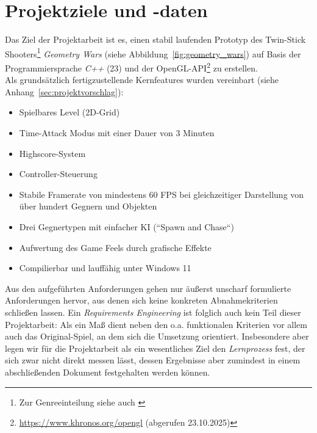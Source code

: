 \section{Projektziele und -daten}\label{sec:projektdaten}

Das Ziel der Projektarbeit ist es, einen stabil laufenden Prototyp des Twin-Stick Shooters\footnote{
Zur Genreeinteilung siehe auch \cite[]{GameDeveloper}
} \textit{Geometry Wars} (siehe Abbildung~\ref{fig:geometry_wars}) auf Basis der Programmiersprache \textit{C++} (23) und der OpenGL-API\footnote{
    \url{https://www.khronos.org/opengl} (abgerufen 23.10.2025)
}  zu erstellen.\\

\noindent
Als grundsätzlich fertigzustellende Kernfeatures wurden vereinbart (siehe Anhang~\ref{sec:projektvorschlag}):

\vspace{2mm}
\begin{itemize}
    \itemsep0.5em
    \item Spielbares Level (2D-Grid)
    \item Time-Attack Modus mit einer Dauer von 3 Minuten
    \item Highscore-System
    \item Controller-Steuerung
    \item Stabile Framerate von mindestens 60 FPS bei gleichzeitiger Darstellung von über hundert Gegnern und Objekten
    \item Drei Gegnertypen mit einfacher KI (``Spawn and Chase``)
    \item Aufwertung des Game Feels durch grafische Effekte
    \item Compilierbar und lauffähig unter Windows 11
\end{itemize}
\vspace{2mm}

Aus den aufgeführten Anforderungen gehen nur äußerst unscharf formulierte Anforderungen hervor, aus denen sich keine konkreten Abnahmekriterien schließen lassen.
Ein \textit{Requirements Engineering} ist folglich auch kein Teil dieser Projektarbeit: Als ein Maß dient neben den o.a. funktionalen Kriterien vor allem auch das Original-Spiel, an dem sich die Umsetzung orientiert.
Insbesondere aber legen wir für die Projektarbeit als ein wesentliches Ziel den \textit{Lernprozess} fest, der sich zwar nicht direkt messen lässt, dessen Ergebnisse aber zumindest in einem abschließenden Dokument festgehalten werden können.

